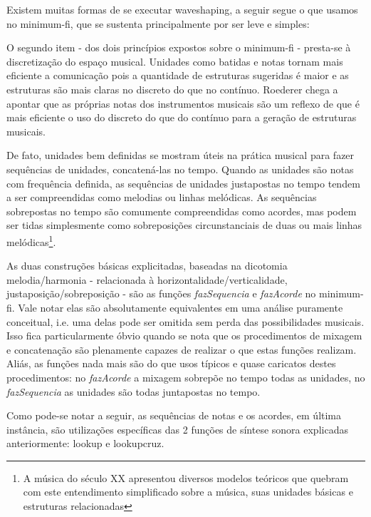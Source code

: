 Existem muitas formas de se executar waveshaping, a seguir segue o que usamos no minimum-fi, que se sustenta principalmente por ser leve e simples:


O segundo item - dos dois princípios expostos sobre o minimum-fi - presta-se à discretização do espaço musical.
Unidades como batidas e notas
tornam mais eficiente a comunicação pois a quantidade
de estruturas sugeridas é maior e as estruturas são mais claras no discreto do que no contínuo.\cite{Roederer} Roederer chega a
apontar que as próprias notas dos instrumentos musicais são um reflexo de que é mais eficiente
o uso do discreto do que do contínuo para a geração de estruturas musicais.

De fato, unidades bem definidas se mostram úteis na prática musical 
para fazer sequências de unidades, concatená-las no tempo. Quando as unidades
são notas com frequência definida, as sequências de unidades justapostas no tempo tendem a ser compreendidas como melodias ou linhas melódicas. As
sequências sobrepostas no tempo são comumente compreendidas como acordes, mas podem ser tidas simplesmente
como sobreposições circunstanciais de duas ou mais linhas melódicas\footnote{A música do século XX apresentou diversos modelos teóricos que quebram com este entendimento simplificado sobre a música, suas unidades básicas e estruturas relacionadas}.\cite{Lacerda}

As duas construções básicas explicitadas, baseadas na dicotomia melodia/harmonia - relacionada à horizontalidade/verticalidade, justaposição/sobreposição - são
as funções \emph{fazSequencia} e \emph{fazAcorde} no minimum-fi. Vale notar elas são absolutamente 
equivalentes em uma análise puramente conceitual, i.e. uma delas pode ser omitida sem perda das possibilidades musicais. Isso fica particularmente óbvio quando se nota que os procedimentos de mixagem e concatenação são
plenamente capazes de realizar o que estas funções realizam. Aliás, as funções nada
mais são do que usos típicos e quase caricatos destes procedimentos: no \emph{fazAcorde} a mixagem
sobrepõe no tempo todas as unidades, no \emph{fazSequencia} as unidades são todas juntapostas no tempo.

Como pode-se notar a seguir, as sequências de notas e os acordes, em última instância, são utilizações específicas das 2 funções de síntese sonora explicadas anteriormente: lookup e lookupcruz.


